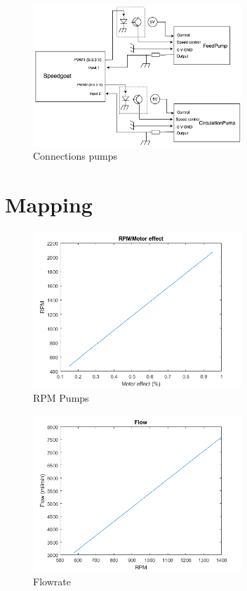 \begin{figure}[h]
    \centering
    \includegraphics[width=0.7\textwidth]{PumpConn}
    \caption{Connections pumps}
    \label{fig:PumpConn}
\end{figure}


\section{Mapping}
\begin{figure}[h]
    \centering
    \includegraphics[width=0.7\textwidth]{RPM.png}
    \caption{RPM Pumps}
    \label{fig:RPM}
\end{figure}


\begin{figure}[h]
    \centering
    \includegraphics[width=0.7\textwidth]{Flow.png}
    \caption{Flowrate}
    \label{fig:Flowrate}
\end{figure}


